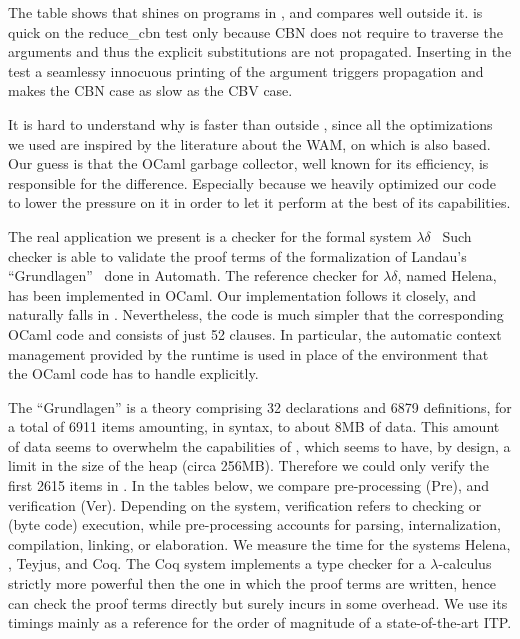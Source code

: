 \documentclass{llncs}
\begin{document}
The table shows that \elpi{} shines on programs in \rff{}, and compares well
outside it. \tedius{} is quick on the reduce\_cbn test only because CBN does not require to traverse the arguments and thus the explicit substitutions are
not propagated. Inserting in the test a seamlessy innocuous printing of the
argument triggers propagation and makes the CBN case as slow as the CBV case.

It is hard to understand why \elpi{} is faster than \tedius{}
outside \rff{}, since all the optimizations we used are inspired by the
literature about the WAM, on which \tedius{} is also based. Our guess is that
the OCaml garbage collector, well known for its efficiency, is responsible for
the difference. Especially because we heavily optimized our code to lower the
pressure on it in order to let it perform at the best of its
capabilities.

The real application we present is a checker for the formal system
$\lambda\delta$~\cite{lambdadeltaJ1,lambdadeltaJ3a} Such
checker is able to validate the proof terms of the formalization of Landau's
``Grundlagen''~\cite{Jut79} done in Automath. The reference checker for
$\lambda\delta$, named Helena, has been implemented in OCaml.
Our \lp{} implementation follows it closely, and
naturally falls in \rff{}.
Nevertheless, the \lp{} code is much simpler that the corresponding OCaml code
and consists of just 52 clauses. In particular, the automatic
context management provided by the \lp{} runtime is used in place of the
environment that the OCaml code has to handle explicitly.

The ``Grundlagen'' is a theory comprising 32 declarations and 6879
definitions, for a total of 6911 items amounting, in \lp{} syntax, to about
8MB of data. This amount of data seems to overwhelm the capabilities of
\tedius{}, which seems to have, by design, a limit in the size of the heap
(circa 256MB). Therefore we could only verify the first 2615 items in
\tedius{}. In the tables below, we compare pre-processing (Pre), and
verification (Ver). Depending on the system, verification refers to checking
or (byte code) execution, while pre-processing accounts for parsing,
internalization, compilation, linking, or elaboration. We measure the time
for the systems Helena, \elpi, Teyjus, and Coq. The Coq system implements a
type checker for a $\lambda$-calculus strictly more powerful then the one in
which the proof terms are written, hence can check the proof terms directly
but surely incurs in some overhead. We use its timings mainly as a reference
for the order of magnitude of a state-of-the-art ITP.
\end{document}
